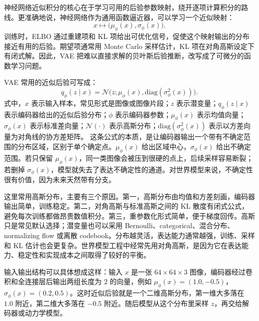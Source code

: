 \documentclass[11pt,a4paper]{ctexart}
\begin{document}
神经网络近似积分的核心在于学习可用的后验参数映射，绕开逐项计算积分的路线。更准确地说，神经网络作为通用函数逼近器，可以学习一个近似映射：
\begin{equation}
  x \mapsto \bigl(\mu_\phi(x),\sigma_\phi(x)\bigr).
\end{equation}
训练时，ELBO 通过重建项和 KL 项给出可优化信号，促使这个映射输出的分布接近有用的后验。期望项通常用 Monte Carlo 采样估计，KL 项在对角高斯设定下有闭式解。因此，VAE 把难以直接求解的贝叶斯后验推断，改写成了可微分的函数学习问题。

VAE 常用的近似后验可写成：
\begin{equation}
  q_\phi(z\mid x) = \mathcal N\!\bigl(z;\mu_\phi(x), \mathrm{diag}(\sigma_\phi^2(x))\bigr).
\end{equation}
式中，$x$ 表示输入样本，常见形式是图像或图像片段；$z$ 表示潜变量；$q_\phi(z\mid x)$ 表示编码器给出的近似后验分布；$\phi$ 表示编码器参数；$\mu_\phi(x)$ 表示均值向量；$\sigma_\phi(x)$ 表示标准差向量；$\mathcal N(\cdot)$ 表示高斯分布；$\mathrm{diag}(\sigma_\phi^2(x))$ 表示以方差向量为对角线的协方差矩阵。
这条公式的本质，是让编码器输出一个带有不确定范围的分布区域，区别于单个确定点。$\mu_\phi(x)$ 给出区域中心，$\sigma_\phi(x)$ 给出不确定范围。若只保留 $\mu_\phi(x)$，同一类图像会被压到很硬的点上，后续采样容易断裂；若删掉 $\sigma_\phi(x)$，模型就失去了表达不确定性的通道。对世界模型来说，不确定性很有价值，因为未来天然带有分支。

这里常用高斯分布，主要有三个原因。第一，高斯分布由均值和方差刻画，编码器输出简单，训练稳定。第二，对角高斯与标准高斯之间的 KL 散度有闭式公式，避免每次训练都做昂贵数值积分。第三，重参数化形式简单，便于梯度回传。高斯只是常见默认选择；潜变量也可以采用 Bernoulli、categorical、混合分布、normalizing flow 或离散 codebook。分布越灵活，表达能力通常越强，训练、采样和 KL 估计也会更复杂。世界模型工程中经常先用对角高斯，是因为它在表达能力、稳定性和实现成本之间取得了较好的平衡。

输入输出结构可以具体想成这样：输入 $x$ 是一张 $64\times64\times3$ 图像，编码器经过卷积和全连接层后输出两组长度为 $2$ 的向量，例如 $\mu_\phi(x)=(1.0,-0.5)$，$\sigma_\phi(x)=(0.2,0.5)$。这时近似后验就是一个二维高斯分布，第一维大多落在 $1.0$ 附近，第二维大多落在 $-0.5$ 附近。随后模型从这个分布里采样 $z$，再交给解码器或动力学模型。
\end{document}
